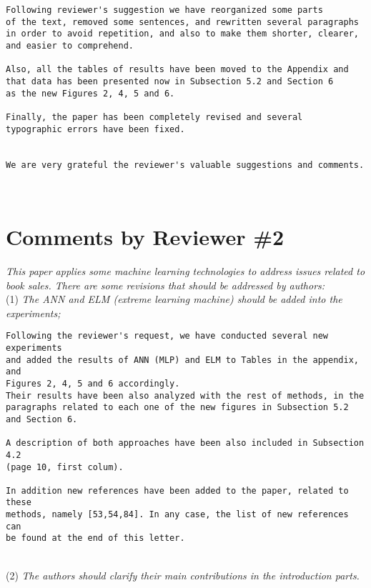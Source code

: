 \documentclass[preprint]{elsarticle}
\begin{document}
\begin{verbatim}
Following reviewer's suggestion we have reorganized some parts 
of the text, removed some sentences, and rewritten several paragraphs 
in order to avoid repetition, and also to make them shorter, clearer, 
and easier to comprehend. 

Also, all the tables of results have been moved to the Appendix and 
that data has been presented now in Subsection 5.2 and Section 6 
as the new Figures 2, 4, 5 and 6.

Finally, the paper has been completely revised and several 
typographic errors have been fixed. 


We are very grateful the reviewer's valuable suggestions and comments. 
\end{verbatim}


~\\

\section{Comments by Reviewer \#2}

\noindent \emph{This paper applies some machine learning technologies to address issues related to book sales. There are some revisions that should be addressed by authors: } \\


\noindent (1) \emph{The ANN and ELM (extreme learning machine) should be added into the experiments; } 

\begin{verbatim}
Following the reviewer's request, we have conducted several new experiments 
and added the results of ANN (MLP) and ELM to Tables in the appendix, and
Figures 2, 4, 5 and 6 accordingly. 
Their results have been also analyzed with the rest of methods, in the 
paragraphs related to each one of the new figures in Subsection 5.2 
and Section 6.

A description of both approaches have been also included in Subsection 4.2
(page 10, first colum).

In addition new references have been added to the paper, related to these 
methods, namely [53,54,84]. In any case, the list of new references can 
be found at the end of this letter.
\end{verbatim}


~\\
\noindent (2) \emph{The authors should clarify their main contributions in the introduction parts.}
\end{document}
